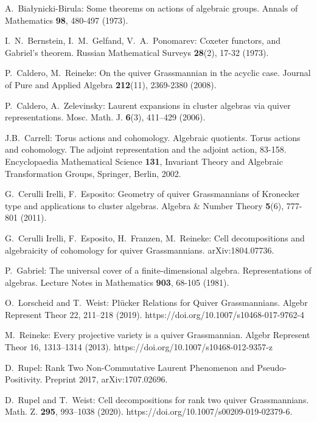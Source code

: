 \documentclass{amsart}
\numberwithin{equation}{section}
\begin{document}
\begin{thebibliography}{10}

  A.~Bia\l{}ynicki-Birula: Some theorems on actions of algebraic groups. Annals of Mathematics \textbf{98}, 480-497 (1973).

  I.~N.~Bernstein, I.~M.~Gelfand, V.~A.~Ponomarev: Coxeter functors, and Gabriel's theorem. Russian Mathematical Surveys \textbf{28}(2), 17-32 (1973).

  P.~Caldero, M.~Reineke: On the quiver Grassmannian in the acyclic case. Journal of Pure and Applied Algebra \textbf{212}(11), 2369-2380 (2008).

  P.~Caldero, A.~Zelevinsky: Laurent expansions in cluster algebras via quiver representations. Mosc. Math. J. \textbf{6}(3), 411–429 (2006).

  J.B.~Carrell: Torus actions and cohomology. Algebraic quotients. Torus actions and cohomology. The adjoint representation and the adjoint action, 83-158. Encyclopaedia Mathematical Science \textbf{131}, Invariant Theory and Algebraic Transformation Groups, Springer, Berlin, 2002.

  G.~Cerulli Irelli, F.~Esposito: Geometry of quiver Grassmannians of Kronecker type and applications to cluster algebras. Algebra \&  Number Theory \textbf{5}(6), 777-801 (2011).

  G.~Cerulli Irelli, F.~Esposito, H.~Franzen, M.~Reineke: Cell decompositions and algebraicity of cohomology for quiver Grassmannians. arXiv:1804.07736.

  P.~Gabriel: The universal cover of a finite-dimensional algebra. Representations of algebras. Lecture Notes in Mathematics {\bf 903}, 68-105 (1981).

  O.~Lorscheid and T.~Weist: Plücker Relations for Quiver Grassmannians. Algebr Represent Theor 22, 211–218 (2019). https://doi.org/10.1007/s10468-017-9762-4

  M.~Reineke: Every projective variety is a quiver Grassmannian. Algebr Represent Theor 16, 1313–1314 (2013). https://doi.org/10.1007/s10468-012-9357-z

  D.~Rupel: Rank Two Non-Commutative Laurent Phenomenon and Pseudo-Positivity. Preprint 2017, arXiv:1707.02696.

  D.~Rupel and T.~Weist: Cell decompositions for rank two quiver Grassmannians.  Math. Z. \textbf{295}, 993–1038 (2020). https://doi.org/10.1007/s00209-019-02379-6.

\end{thebibliography}
\end{document}
